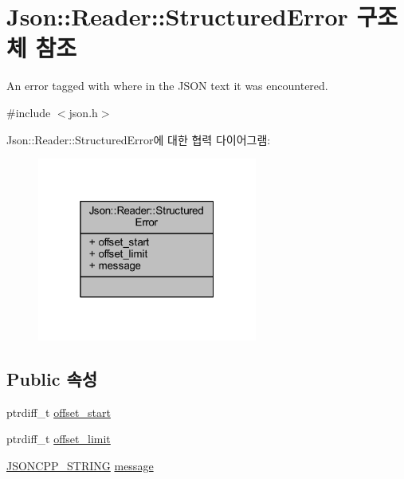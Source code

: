 \hypertarget{struct_json_1_1_reader_1_1_structured_error}{}\section{Json\+:\+:Reader\+:\+:Structured\+Error 구조체 참조}
\label{struct_json_1_1_reader_1_1_structured_error}


An error tagged with where in the J\+S\+ON text it was encountered.  




{\ttfamily \#include $<$json.\+h$>$}



Json\+:\+:Reader\+:\+:Structured\+Error에 대한 협력 다이어그램\+:\nopagebreak
\begin{figure}[H]
\begin{center}
\leavevmode
\includegraphics[width=205pt]{struct_json_1_1_reader_1_1_structured_error__coll__graph}
\end{center}
\end{figure}
\subsection*{Public 속성}
\begin{DoxyCompactItemize}
\item 
ptrdiff\+\_\+t \hyperlink{struct_json_1_1_reader_1_1_structured_error_ac98af0da2d704be4b64a9572a682423b}{offset\+\_\+start}
\item 
ptrdiff\+\_\+t \hyperlink{struct_json_1_1_reader_1_1_structured_error_ad76ac01aeb0ada7e882c2df5daa54c6e}{offset\+\_\+limit}
\item 
\hyperlink{json_8h_a1e723f95759de062585bc4a8fd3fa4be}{J\+S\+O\+N\+C\+P\+P\+\_\+\+S\+T\+R\+I\+NG} \hyperlink{struct_json_1_1_reader_1_1_structured_error_a2d2dc387aefe406a71de3daa263a38f4}{message}
\end{DoxyCompactItemize}


